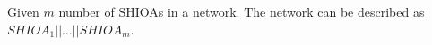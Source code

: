 {\color{red} Given $m$ number of \acp{SHIOA} in a network.  The network
  can be described as $SHIOA_1 || \dots || SHIOA_m$.}


% 
%   
%     


